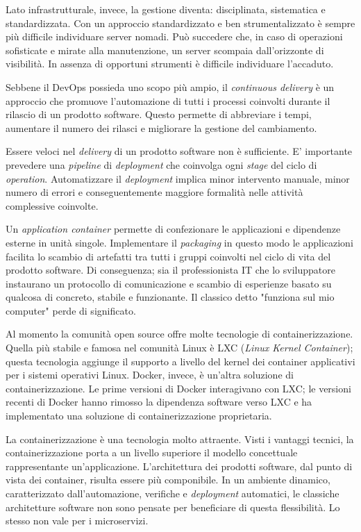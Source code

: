 Lato infrastrutturale, invece, la gestione diventa: disciplinata, sistematica e standardizzata. Con un approccio standardizzato e ben strumentalizzato è sempre più difficile individuare server nomadi. Può succedere che, in caso di operazioni sofisticate e mirate alla manutenzione, un server scompaia dall'orizzonte di visibilità. In assenza di opportuni strumenti è difficile individuare l'accaduto.   

Sebbene il DevOps possieda uno scopo più ampio, il \textit{continuous delivery} è un approccio che promuove l'automazione di tutti i processi coinvolti 
durante il rilascio di un prodotto software. Questo permette di abbreviare i tempi, aumentare il numero dei rilasci e migliorare la gestione del cambiamento.

Essere veloci nel \textit{delivery} di un prodotto software non è sufficiente. E' importante prevedere una \textit{pipeline} di \textit{deployment} che coinvolga ogni \textit{stage} del ciclo di \textit{operation}. Automatizzare il \textit{deployment} implica minor intervento manuale, minor numero di errori e conseguentemente maggiore formalità nelle attività complessive coinvolte. 

Un \textit{application container} permette di confezionare le applicazioni e dipendenze esterne in unità singole. Implementare il \textit{packaging} in questo modo le applicazioni facilita lo scambio di artefatti tra tutti i gruppi coinvolti nel ciclo di vita del prodotto software. Di conseguenza; sia il professionista IT che lo sviluppatore instaurano un protocollo di comunicazione e scambio di esperienze basato su qualcosa di concreto, stabile e funzionante.
Il classico detto "funziona sul mio computer" perde di significato.

Al momento la comunità open source offre molte tecnologie di containerizzazione. Quella più stabile e famosa nel comunità Linux è LXC (\textit{Linux Kernel Container}); questa tecnologia aggiunge il supporto a livello del kernel dei container applicativi per i sistemi operativi Linux. Docker, invece, è un'altra soluzione di containerizzazione. Le prime versioni di Docker interagivano con LXC; le versioni recenti di Docker hanno rimosso la dipendenza software verso LXC e ha implementato una soluzione di containerizzazione proprietaria. 

La containerizzazione è una tecnologia molto attraente. Visti i vantaggi tecnici, la containerizzazione porta a un livello superiore il modello concettuale rappresentante un'applicazione.  L'architettura dei prodotti software, dal punto di vista dei container, risulta essere più componibile. In un ambiente dinamico, caratterizzato dall'automazione, verifiche e \textit{deployment} automatici, le classiche architetture software non sono pensate per beneficiare di questa flessibilità. Lo stesso non vale per i  microservizi. 

